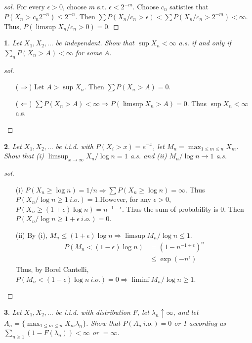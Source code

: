\documentclass{report}
\newtheorem{ex}{}[section]
\begin{document}
\begin{proof}[sol]
For  every $\epsilon > 0$, choose $m$ s.t. $\epsilon < 2^{-m}$. Choose $c_n$ satisties that $P(X_n > c_n2^{-n}) \le 2^{-n}$. Then $\sum P(X_n / c_n > \epsilon) < \sum P(X_n / c_n > 2^{-m}) < \infty$. Thus, $P(\limsup X_n / c_n > 0) = 0$.
\end{proof}
\begin{ex}
Let $X_1,X_2,...$ be independent. Show that $\sup X_n < \infty$ a.s. if and only if $\sum_n P(X_n > A) < \infty$ for some $A$.
\end{ex}
\begin{proof}[sol]~\
\begin{enumerate}
	\item[($\Rightarrow$)] Let $A > \sup X_n$. Then $\sum P(X_n > A) = 0$.
	\item[($\Leftarrow$)] $\sum P(X_n > A) < \infty \Rightarrow P(\limsup X_n > A) = 0$. Thus $\sup X_n < \infty$ a.s.
\end{enumerate}
\end{proof}
\begin{ex}
Let $X_1, X_2,...$ be i.i.d. with $P(X_i > x)  = e^{-x}$, let $M_n = \max_{1\le m \le n} X_m$. Show that (i) $\limsup_{x\to\infty} X_n / \log n = 1$ a.s. and (ii) $M_n / \log n \to 1$ a.s.
\end{ex}
\begin{proof}[sol]~\
\begin{enumerate}
\item[(i)] $P(X_n \ge \log n) = 1/n \Rightarrow \sum P(X_n \ge \log n) = \infty$. Thus $P(X_n/\log n \ge 1\ i.o.) = 1$.However, for any $\epsilon > 0$, $P(X_n \ge (1 + \epsilon )\log n) = n^{-1-\epsilon}$. Thus the sum of probability is 0. Then $P( X_n/\log n \ge 1 + \epsilon\ i.o.) = 0$.
\item[(ii)] By (i), $M_n \le (1+\epsilon)\log n \Rightarrow \limsup M_n/\log n \le 1$.
\begin{align*}
P(M_n < (1-\epsilon)\log n) &= (1 - n^{-1+\epsilon})^n\\
&\le \exp(-n^\epsilon)
\end{align*}
Thus, by Borel Cantelli, $P(M_n < (1-\epsilon)\log n\ i.o.) = 0 \Rightarrow \liminf M_n/\log n \ge 1$.
\end{enumerate}
\end{proof}
\begin{ex}
Let $X_1,X_2,...$ be i.i.d. with distribution $F$, let $\lambda_n \uparrow \infty$, and let $A_n = \{\max_{1\le m\le n} X_m \lambda_n\}$. Show that $P(A_n \ i.o.) = 0$ or 1 according as $\sum_{n \ge 1} (1 - F(\lambda_n)) < \infty$ or $ = \infty$.
\end{ex}
\end{document}
